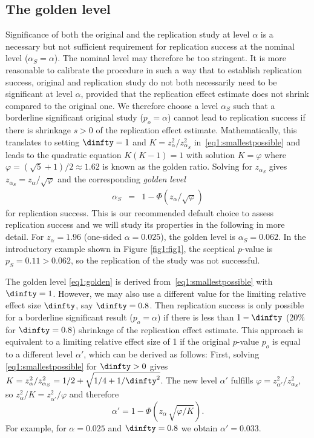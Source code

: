 \subsection{The golden level}\label{sec1:goldenthresh}
Significance of both the original and the replication study at level $\alpha$ is
a necessary but not sufficient requirement for replication success at the
nominal level ($\alpha_S = \alpha$). The nominal level may therefore be too
stringent. It is more reasonable to calibrate the procedure in such a way that
to establish replication success, original and replication study do not both
necessarily need to be significant at level $\alpha$, provided that the
replication effect estimate does not shrink compared to the original one. We
therefore choose a level $\alpha_S$ such that a borderline significant original
study ($p_o = \alpha$) cannot lead to replication success if there is shrinkage
$s > 0$ of the replication effect estimate. Mathematically, this translates to
setting $\dinfty = 1$ and $K = z_\alpha^2/z_{\alpha_S}^2$
in~\eqref{eq1:smallestpossible} and leads to the quadratic equation $K(K-1) = 1$
with solution $K = \varphi$ where $\varphi = (\sqrt{5}+1)/2 \approx 1.62$ is
known as the golden ratio. Solving for $z_{\alpha_S}$ gives
$z_{\alpha_S} = z_\alpha / \sqrt{\varphi}$ and the corresponding \textit{golden
  level}
\begin{eqnarray}\label{eq1:golden}
\alpha_S & = & 1 -  \Phi(z_\alpha / \sqrt{\varphi} )
\end{eqnarray}
for replication success. This is our recommended default choice to assess
replication success and we will study its properties in the following in more
detail. For $z_\alpha = 1.96$ (one-sided $\alpha = 0.025$), the golden level is
$\alpha_S =0.062$. In the introductory example shown in Figure \ref{fig1:fig1},
the sceptical $p$-value is $p_S=0.11 > 0.062$, so the replication of the
\citet{Pyc2010} study was not successful.




The golden level \eqref{eq1:golden} is derived from~\eqref{eq1:smallestpossible}
with $\dinfty = 1$. However, we may also use a different value for the limiting
relative effect size $\dinfty$, say $\dinfty=0.8$. Then replication success is
only possible for a borderline significant result ($p_o = \alpha$) if there is
less than $1-\dinfty$ (20\% for $\dinfty=0.8$) shrinkage of the replication
effect estimate. This approach is equivalent to a limiting relative effect size
of 1 if the original $p$-value $p_o$ is equal to a different level $\alpha'$,
which can be derived as follows: First, solving \eqref{eq1:smallestpossible} for
$\dinfty > 0$ gives
$K = z_\alpha^2/z_{\alpha_S}^2 = 1/2+\sqrt{1/4 + 1/\dinfty^2}$. The new level
$\alpha'$ fulfills $\varphi=z_{\alpha'}^2/z_{\alpha_S}^2$, so
$z_\alpha^2/K=z_{\alpha'}^2/\varphi$ and therefore
\begin{equation}\label{eq1:alphaPrime}
\alpha' = 1-\Phi\left(z_{\alpha} \, \sqrt{\varphi / K} \right).
\end{equation}
For example, for $\alpha = 0.025$ and $\dinfty = 0.8$ we obtain $\alpha'=0.033$.


